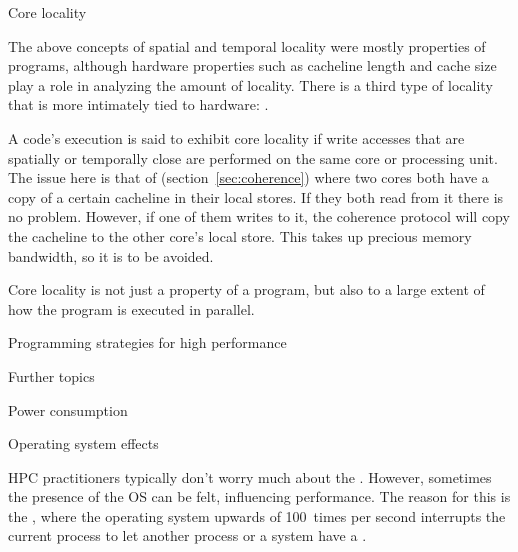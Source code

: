  {Core locality}

The above concepts of spatial and temporal locality were mostly
properties of programs, although hardware properties such as cacheline
length and cache size play a role in analyzing the amount of
locality. There is a third type of locality that is more intimately
tied to hardware: .

A code's execution is said to exhibit core locality if write accesses
that are spatially or temporally close are performed on the same core
or processing unit. The issue here is that of
 (section~\ref{sec:coherence}) where two
cores both have a copy of a certain cacheline in their local stores.
If they both read from it there is no problem. However, if one of them
writes to it, the coherence protocol will copy the cacheline to the
other core's local store. This takes up precious memory bandwidth, so
it is to be avoided.

Core locality is not just a property of a program, but also to a large
extent of how
the program is executed in parallel.

 {Programming strategies for high performance}
\label{sec:performance-programming}


 {Further topics}

 {Power consumption}
\label{sec:power}


 {Operating system effects}

HPC practitioners typically don't worry much about the
. However, sometimes the presence of the \ac{OS} can be
felt, influencing performance. The reason for this is the
, where the operating system upwards
of 100~times per second interrupts the current process to let another
process or a system  have a .


